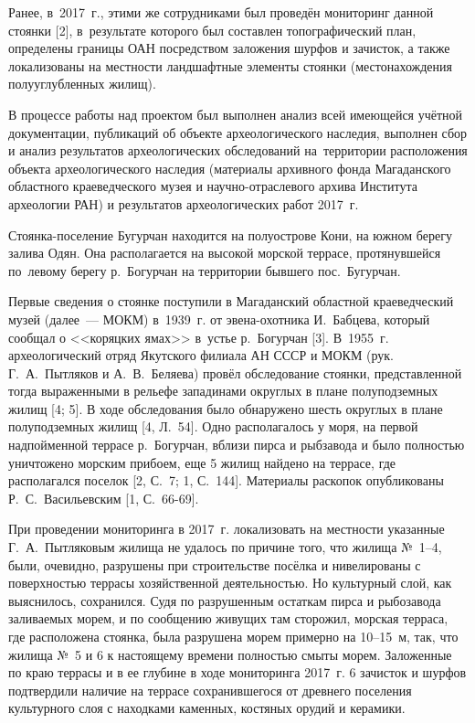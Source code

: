Ранее, в~2017~г., этими же сотрудниками был проведён мониторинг данной стоянки [2], в~результате которого был составлен топографический план, определены границы ОАН посредством заложения шурфов и зачисток, а также локализованы на местности ландшафтные элементы стоянки (местонахождения полууглубленных жилищ).

В процессе работы над проектом был выполнен анализ всей имеющейся учётной документации, публикаций об объекте археологического наследия, выполнен сбор и анализ результатов археологических обследований на~территории расположения объекта археологического наследия (материалы архивного фонда Магаданского областного краеведческого музея и научно-отраслевого архива Института археологии РАН) и результатов археологических работ 2017~г.

Стоянка-поселение Бугурчан находится на полуострове Кони, на южном берегу залива Одян. Она располагается на высокой морской террасе, протянувшейся по~левому берегу р.~Богурчан на территории бывшего пос.~Бугурчан.

Первые сведения о стоянке поступили в Магаданский областной краеведческий музей (далее~--- МОКМ) в~1939~г. от эвена-охотника И.~Бабцева, который сообщал о <<коряцких ямах>> в~устье р.~Богурчан [3]. В~1955~г. археологический отряд Якутского филиала АН СССР и МОКМ (рук. Г.~А.~Пытляков и А.~В.~Беляева) провёл обследование стоянки, представленной тогда выраженными в рельефе западинами округлых в пла­не полуподземных жилищ [4; 5]. В ходе обследования было обнаружено шесть округлых в плане полуподземных жилищ [4, Л.~54]. Одно располагалось у моря, на первой надпойменной террасе р.~Богурчан, вблизи пирса и рыбзавода и было полностью уничтожено морским прибоем, еще 5 жилищ найдено на террасе, где располагался поселок [2, С.~7; 1, С.~144]. Материалы раскопок опубликованы Р.~С.~Васильевским [1, С.~66-69].

При проведении мониторинга в 2017~г. локализовать на местности указанные Г.~А.~Пытляковым жилища не удалось по причине того, что жилища №~1--4, были, очевидно, разрушены при строительстве посёлка и нивелированы с поверхностью террасы хозяйственной деятельностью. Но культурный слой, как выяснилось, сохранился. Судя по разрушенным остаткам пирса и рыбозавода заливаемых морем, и по сообщению живущих там сторожил, морская терраса, где расположена стоянка, была разрушена морем примерно на 10--15~м, так, что жилища №~5 и 6 к настоящему времени полностью смыты морем.
Заложенные по краю террасы и в ее глубине в ходе мониторинга 2017~г. 6 зачисток и шурфов подтвердили наличие на террасе сохранившегося от древнего поселения культурного слоя с находками каменных, костяных орудий и керамики.


